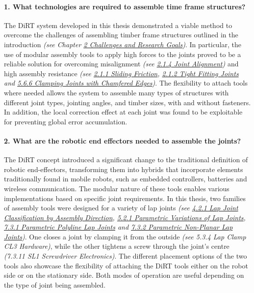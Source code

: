 	\paragraph{1. What technologies are required to assemble time frame structures?}

The DiRT system developed in this thesis demonstrated a viable method to overcome the challenges of assembling timber frame structures outlined in the introduction \textit{(see Chapter \ul{2 Challenges and Research Goals})}. In particular, the use of modular assembly tools to apply high forces to the joints proved to be a reliable solution for overcoming misalignment \textit{(see \ul{2.1.4 Joint Alignment}) }and high assembly resistance \textit{(see \ul{2.1.1 Sliding Friction}, \ul{2.1.2 Tight Fitting Joints} and \ul{5.6.6 Clamping Joints with Chamfered Edges})}. The flexibility to attach tools where needed allows the system to assemble many types of structures with different joint types, jointing angles, and timber sizes, with and without fasteners. In addition, the local correction effect at each joint was found to be exploitable for preventing global error accumulation.

\paragraph{2. What are the robotic end effectors needed to assemble the joints?}

The DiRT concept introduced a significant change to the traditional definition of robotic end-effectors, transforming them into hybrids that incorporate elements traditionally found in mobile robots, such as embedded controllers, batteries and wireless communication. The modular nature of these tools enables various implementations based on specific joint requirements. In this thesis, two families of assembly tools were designed for a variety of lap joints \textit{(see \ul{4.2.1 Lap Joint Classification by Assembly Direction}, \ul{5.2.1 Parametric Variations of Lap Joints}, \ul{7.3.1 Parametric Polyline Lap Joints} and \ul{7.3.2 Parametric Non-Planar Lap Joints})}. One closes a joint by clamping it from the outside \textit{(see 5.3.4 Lap Clamp CL3 Hardware)}, while the other tightens a screw through the joint's centre \textit{(7.3.11 SL1 Screwdriver Electronics)}. The different placement options of the two tools also showcase the flexibility of attaching the DiRT tools either on the robot side or on the stationary side. Both modes of operation are useful depending on the type of joint being assembled.

